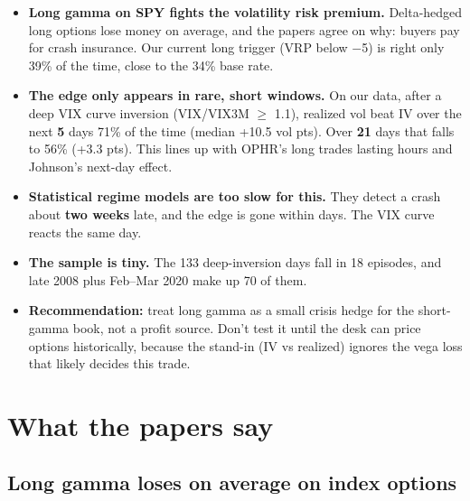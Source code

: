\documentclass{article}
\begin{document}
\begin{itemize}

\item \textbf{Long gamma on SPY fights the volatility risk premium.} Delta-hedged long options lose money on average, and the papers agree on why: buyers pay for crash insurance. Our current long trigger (VRP below \ensuremath{-}5) is right only 39\% of the time, close to the 34\% base rate.

\item \textbf{The edge only appears in rare, short windows.} On our data, after a deep VIX curve inversion (VIX/\allowbreak{}VIX3M \ensuremath{\geq} 1.1), realized vol beat IV over the next \textbf{5} days 71\% of the time (median +10.5 vol pts). Over \textbf{21} days that falls to 56\% (+3.3 pts). This lines up with OPHR's long trades lasting hours and Johnson's next-day effect.

\item \textbf{Statistical regime models are too slow for this.} They detect a crash about \textbf{two weeks} late, and the edge is gone within days. The VIX curve reacts the same day.

\item \textbf{The sample is tiny.} The 133 deep-inversion days fall in 18 episodes, and late 2008 plus Feb--Mar 2020 make up 70 of them.

\item \textbf{Recommendation:} treat long gamma as a small crisis hedge for the short-gamma book, not a profit source. Don't test it until the desk can price options historically, because the stand-in (IV vs realized) ignores the vega loss that likely decides this trade.

\end{itemize}

\section{What the papers say}

\subsection{Long gamma loses on average on index options}
\end{document}
